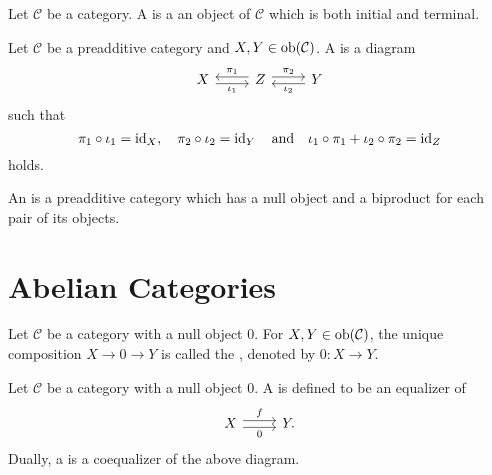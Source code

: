 \begin{definition}
	Let $\mathcal{C}$ be a category. A  is a an object of $\mathcal{C}$ which is both initial and terminal.
\end{definition}

\begin{definition}
	Let $\mathcal{C}$ be a preadditive category and $X,Y \in \operatorname{ob}(\mathcal{C})$. A  is a diagram
	\begin{equation*}
		\begin{tikzcd}
			X \arrow[r, shift right, "\iota_1"'] & Z \arrow[r,shift left, "\pi_2"]\arrow[l,shift right,"\pi_1"'] & Y \arrow[l,shift left,"\iota_2"] 
		\end{tikzcd}
	\end{equation*}
	\noindent such that
	\begin{equation*}
		\pi_1\circ\iota_1 = \operatorname{id}_X, \quad \pi_2\circ\iota_2 = \operatorname{id}_Y \quad \text{and} \quad \iota_1 \circ \pi_1 + \iota_2 \circ \pi_2 = \operatorname{id}_Z
	\end{equation*}
	\noindent holds.
\end{definition}

\begin{definition}
	An  is a preadditive category which has a null object and a biproduct for each pair of its objects.	
\end{definition}

\section{Abelian Categories}

\begin{definition}
	Let $\mathcal{C}$ be a category with a null object $0$. For $X,Y \in \operatorname{ob}(\mathcal{C})$, the unique composition $X \to 0 \to Y$ is called the , denoted by $0 : X \to Y$.
\end{definition}

\begin{definition}
	Let $\mathcal{C}$ be a category with a null object $0$. A  is defined to be an equalizer of
	\begin{equation*}
		\begin{tikzcd}
			X \arrow[r, shift left, "f"]\arrow[r,shift right,"0"'] & Y.
		\end{tikzcd}
	\end{equation*}
	Dually, a  is a coequalizer of the above diagram. 
\end{definition}

